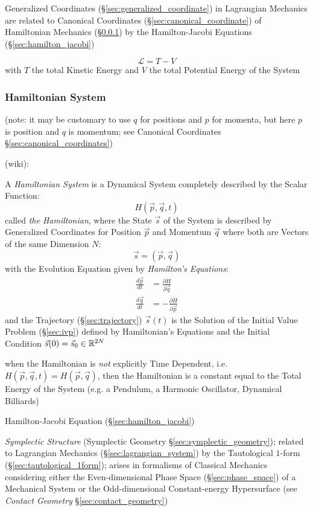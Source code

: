 Generalized Coordinates (\S\ref{sec:generalized_coordinate}) in Lagrangian
Mechanics are related to Canonical Coordinates
(\S\ref{sec:canonical_coordinate}) of Hamiltonian Mechanics
(\S\ref{sec:hamiltonian_system}) by the Hamilton-Jacobi Equations
(\S\ref{sec:hamilton_jacobi})

\[
  \mathcal{L} = T - V
\]
with $T$ the total Kinetic Energy and $V$ the total Potential Energy of the
System



\subsubsection{Hamiltonian System}\label{sec:hamiltonian_system}

(note: it may be customary to use $q$ for positions and $p$ for momenta, but
here $p$ is position and $q$ is momentum; see Canonical Coordinates
\S\ref{sec:canonical_coordinates})

(wiki):

A \emph{Hamiltonian System} is a Dynamical System completely described by the
Scalar Function:
\[
  H(\vec{p},\vec{q},t)
\]
called \emph{the Hamiltonian}, where the State $\vec{s}$ of the System is
described by Generalized Coordinates for Position $\vec{p}$ and Momentum
$\vec{q}$ where both are Vectors of the same Dimension $N$:
\[
  \vec{s} = (\vec{p},\vec{q})
\]
with the Evolution Equation given by \emph{Hamilton's Equations}:
\begin{align*}
  \frac{d\vec{p}}{dt} & = \frac{\partial{H}}{\partial{\vec{q}}} \\
  \frac{d\vec{q}}{dt} & = -\frac{\partial{H}}{\partial{\vec{p}}}
\end{align*}
and the Trajectory (\S\ref{sec:trajectory}) $\vec{s}(t)$ is the Solution of
the Initial Value Problem (\S\ref{sec:ivp}) defined by Hamiltonian's Equations
and the Initial Condition $\vec{s}(0) = \vec{s}_0 \in \mathbb{R}^{2N}$

when the Hamiltonian is \emph{not} explicitly Time Dependent, i.e.
$H(\vec{p},\vec{q},t) = H(\vec{p},\vec{q})$, then the Hamiltonian is a
constant equal to the Total Energy of the System (e.g. a Pendulum, a Harmonic
Oscillator, Dynamical Billiards)

\fist Hamilton-Jacobi Equation (\S\ref{sec:hamilton_jacobi})

\emph{Symplectic Structure} (Symplectic Geometry
\S\ref{sec:symplectic_geometry}); related to Lagrangian Mechanics
(\S\ref{sec:lagrangian_system}) by the Tautological $1$-form
(\S\ref{sec:tautological_1form}); arises in formalisms of Classical Mechanics
considering either the Even-dimensional Phase Space (\S\ref{sec:phase_space})
of a Mechanical System or the Odd-dimensional Constant-energy Hypersurface (see
\emph{Contact Geometry} \S\ref{sec:contact_geometry})


